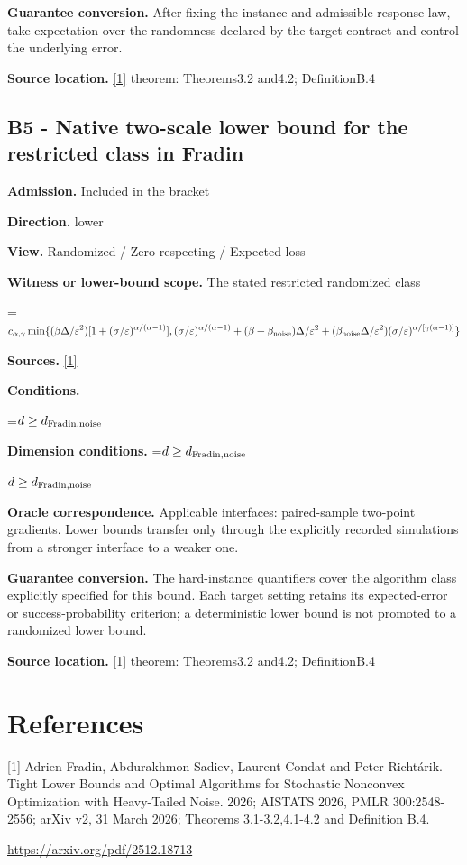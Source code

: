 \documentclass[10pt,a4paper]{article}
\newcommand{\AtlasMath}[1]{\par\begingroup\centering\setbox0=\hbox{$\displaystyle #1$}\ifdim\wd0>1.4\linewidth\typeout{ATLAS WIDE FORMULA: \the\wd0}\fi\ifdim\wd0>\linewidth\resizebox{\linewidth}{!}{\box0}\else\box0\fi\par\endgroup}
\newcommand{\AtlasInlineMath}[1]{\begingroup\setbox0=\hbox{$#1$}\ifdim\wd0>.4\linewidth\endgroup\AtlasMath{#1}\else\endgroup$#1$\fi}
\begin{document}
\textbf{Guarantee conversion.} After fixing the instance and admissible response law, take expectation over the randomness declared by the target contract and control the underlying error.

\textbf{Source location.} \href{https://arxiv.org/pdf/2512.18713}{[1]} theorem: Theorems3.2 and4.2; DefinitionB.4

\subsection{B5 - Native two-scale lower bound for the restricted class in Fradin}
\textbf{Admission.} Included in the bracket

\textbf{Direction.} lower

\textbf{View.} Randomized / Zero respecting / Expected loss

\textbf{Witness or lower-bound scope.} The stated restricted randomized class

\AtlasMath{c_{\alpha,\gamma}\min\{(\beta\Delta/\varepsilon^2)[1+(\sigma/\varepsilon)^{\alpha/(\alpha-1)}],(\sigma/\varepsilon)^{\alpha/(\alpha-1)}+(\beta+\beta_{\rm noise})\Delta/\varepsilon^2+(\beta_{\rm noise}\Delta/\varepsilon^2)(\sigma/\varepsilon)^{\alpha/[\gamma(\alpha-1)]}\}}
\textbf{Sources.} \href{https://arxiv.org/pdf/2512.18713}{[1]}

\textbf{Conditions.} 
\AtlasMath{d\ge d_{\rm Fradin,noise}}


\textbf{Dimension conditions.} \AtlasInlineMath{d\ge d_{\rm Fradin,noise}}

\textbf{Oracle correspondence.} Applicable interfaces: paired-sample two-point gradients. Lower bounds transfer only through the explicitly recorded simulations from a stronger interface to a weaker one.

\textbf{Guarantee conversion.} The hard-instance quantifiers cover the algorithm class explicitly specified for this bound. Each target setting retains its expected-error or success-probability criterion; a deterministic lower bound is not promoted to a randomized lower bound.

\textbf{Source location.} \href{https://arxiv.org/pdf/2512.18713}{[1]} theorem: Theorems3.2 and4.2; DefinitionB.4

\section{References}
[1] Adrien Fradin, Abdurakhmon Sadiev, Laurent Condat and Peter Richtárik. Tight Lower Bounds and Optimal Algorithms for Stochastic Nonconvex Optimization with Heavy-Tailed Noise. 2026; AISTATS 2026, PMLR 300:2548-2556; arXiv v2, 31 March 2026; Theorems 3.1-3.2,4.1-4.2 and Definition B.4.

\url{https://arxiv.org/pdf/2512.18713}
\end{document}
